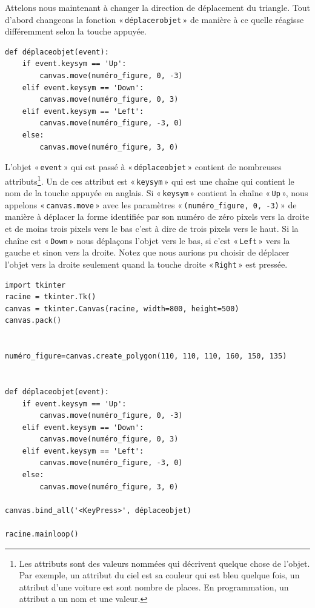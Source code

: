 Attelons nous maintenant à changer la direction de déplacement du triangle. Tout d'abord changeons la fonction « \texttt{déplacerobjet} » de manière à ce quelle réagisse différemment selon la touche appuyée.
\begin{Verbatim}[frame=single,rulecolor=\color{mbleu}, label=à taper]
def déplaceobjet(event):
    if event.keysym == 'Up':
        canvas.move(numéro_figure, 0, -3)
    elif event.keysym == 'Down':
        canvas.move(numéro_figure, 0, 3)
    elif event.keysym == 'Left':
        canvas.move(numéro_figure, -3, 0)
    else:
        canvas.move(numéro_figure, 3, 0)
\end{Verbatim}

L'objet « \texttt{event} » qui est passé à « \texttt{déplaceobjet} » contient de nombreuses attributs\footnote{Les attributs sont des valeurs nommées qui décrivent quelque chose de l'objet. Par exemple, un attribut du ciel est sa couleur qui est bleu quelque fois, un attribut d'une voiture est sont nombre de places. En programmation, un attribut a un nom et une valeur.}. Un de ces attribut est « \texttt{keysym} » qui est une chaîne qui contient le nom de la touche appuyée en anglais. Si « \texttt{keysym} » contient la chaîne « \texttt{Up} », nous appelons « \texttt{canvas.move} »  avec les paramètres « \texttt{(numéro\_figure, 0, -3)} » de manière à déplacer la forme identifiée par son numéro de zéro pixels vers la droite et de moins trois pixels vers le bas c'est à dire de trois pixels vers le haut. Si la chaîne est « \texttt{Down} » nous déplaçons l'objet vers le bas, si c'est « \texttt{Left} » vers la gauche et sinon vers la droite. Notez que nous aurions pu choisir de déplacer l'objet vers la droite seulement quand la touche droite « \texttt{Right} » est pressée.

\begin{Verbatim}[frame=single,rulecolor=\color{mbleu}, label=à taper]
import tkinter
racine = tkinter.Tk()
canvas = tkinter.Canvas(racine, width=800, height=500)
canvas.pack()


numéro_figure=canvas.create_polygon(110, 110, 110, 160, 150, 135)


def déplaceobjet(event):
    if event.keysym == 'Up':
        canvas.move(numéro_figure, 0, -3)
    elif event.keysym == 'Down':
        canvas.move(numéro_figure, 0, 3)
    elif event.keysym == 'Left':
        canvas.move(numéro_figure, -3, 0)
    else:
        canvas.move(numéro_figure, 3, 0)

canvas.bind_all('<KeyPress>', déplaceobjet)

racine.mainloop()
\end{Verbatim}

